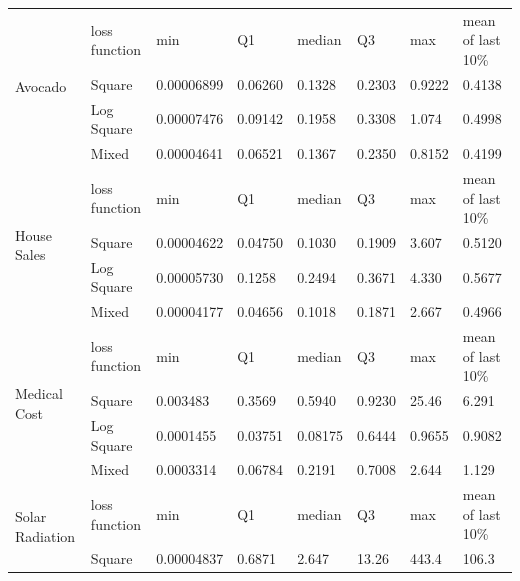 \documentclass[runningheads]{llncs}
\begin{document}
\begin{table}[h]
\begin{center}
\begin{tabular}{|l|l|l|l|l|l|l|l|}
\hline
\multirow{4}{*}{Avocado}         & loss function & min        & Q1      & median & Q3     & max    & mean of last 10\% \\ \cline{2-8} 
                                 & Square        & 0.00006899 & 0.06260 & 0.1328 & 0.2303 & 0.9222 & 0.4138            \\ \cline{2-8} 
                                 & Log Square    & 0.00007476 & 0.09142 & 0.1958 & 0.3308 & 1.074  & 0.4998            \\ \cline{2-8} 
                                 & Mixed         & 0.00004641 & 0.06521 & 0.1367 & 0.2350 & 0.8152 & 0.4199            \\ \hline
\multirow{4}{*}{House Sales}     & loss function & min        & Q1      & median & Q3     & max    & mean of last 10\% \\ \cline{2-8} 
                                 & Square        & 0.00004622 & 0.04750 & 0.1030 & 0.1909 & 3.607 & 0.5120            \\ \cline{2-8} 
                                 & Log Square    & 0.00005730 & 0.1258 & 0.2494 & 0.3671 & 4.330 & 0.5677            \\ \cline{2-8} 
                                 & Mixed         & 0.00004177 & 0.04656 & 0.1018 & 0.1871 & 2.667 & 0.4966            \\ \hline
\multirow{4}{*}{Medical Cost}    & loss function & min        & Q1      & median & Q3     & max    & mean of last 10\% \\ \cline{2-8} 
                                 & Square        & 0.003483 & 0.3569 & 0.5940 & 0.9230 & 25.46        &    6.291               \\ \cline{2-8} 
                                 & Log Square    & 0.0001455 & 0.03751 & 0.08175 & 0.6444 & 0.9655  &   0.9082                \\ \cline{2-8} 
                                 & Mixed         &  0.0003314 & 0.06784 & 0.2191 & 0.7008 & 2.644        &  1.129                 \\ \hline
\multirow{4}{*}{Solar Radiation} & loss function & min        & Q1      & median & Q3     & max    & mean of last 10\% \\ \cline{2-8} 
                                 & Square        & 0.00004837 & 0.6871 & 2.647 & 13.26 & 443.4 & 106.3                  \\ \cline{2-8} 

\end{tabular}
\end{center}
\end{table}
\end{document}
